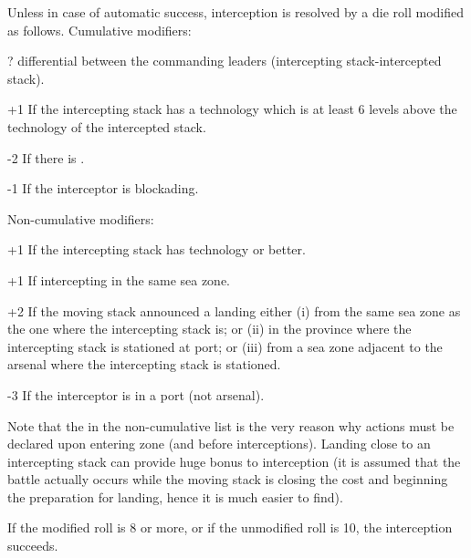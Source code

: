 Unless in case of automatic success, interception is resolved by a die roll
modified as follows. Cumulative modifiers:
\begin{modlist}
\item[\textplusminus?] \Man differential between the commanding leaders
  (intercepting stack-intercepted stack).
\item[+1] If the intercepting stack has a technology which is at least 6
  levels above the technology of the intercepted stack.
\item[-2] If there is .
\item[-1] If the interceptor is blockading.
\end{modlist}
Non-cumulative modifiers:
\begin{modlist}
\item[+1] If the intercepting stack has technology \TTD or better.
\item[+1] If intercepting in the same sea zone.
\item[+2] If the moving stack announced a landing either (i) from the same sea
  zone as the one where the intercepting stack is; or (ii) in the province
  where the intercepting stack is stationed at port; or (iii) from a sea zone
  adjacent to the arsenal where the intercepting stack is stationed.
\item[-3] If the interceptor is in a port (not arsenal).
\end{modlist}

Note that the  in the non-cumulative list is the very reason why
actions must be declared upon entering zone (and before
interceptions). Landing close to an intercepting stack can provide huge bonus
to interception (it is assumed that the battle actually occurs while the
moving stack is closing the cost and beginning the preparation for landing,
hence it is much easier to find).

If the modified roll is 8 or more, or if the unmodified roll is 10, the
interception succeeds.

